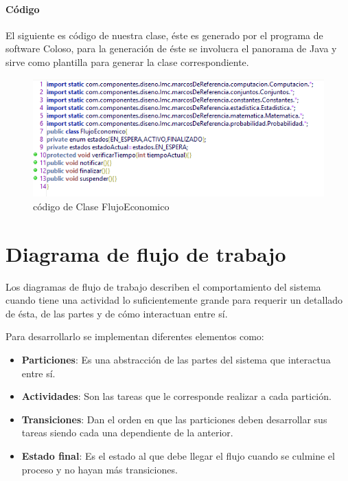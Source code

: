 \paragraph{Código}

El siguiente es código de nuestra clase, éste es generado por el programa de software Coloso, para la generación de éste se involucra el panorama de Java y sirve como plantilla para generar la clase correspondiente.

\begin{figure}[H]
	\centering
	\includegraphics[width=1\linewidth]{parte2/imgs/DiagramaDeEstado/codigo}
	\caption{código de Clase FlujoEconomico}
	\label{fig:diagramaEstadoClaseCodigo}
\end{figure}\newpage

\section{Diagrama de flujo de trabajo}
Los diagramas de flujo de trabajo describen el comportamiento del sistema cuando tiene una actividad lo suficientemente grande para requerir un detallado de ésta, de las partes y de cómo interactuan entre sí.

Para desarrollarlo se implementan diferentes elementos como:

\begin{itemize}
	\item \textbf{Particiones}: Es una abstracción de las partes del sistema que interactua entre sí.
	\item \textbf{Actividades}: Son las tareas que le corresponde realizar a cada partición.
	\item \textbf{Transiciones}: Dan el orden en que las particiones deben desarrollar sus tareas siendo cada una dependiente de la anterior.	
	\item \textbf{Estado final}: Es el estado al que debe llegar el flujo cuando se culmine el proceso y no hayan más transiciones.
\end{itemize}

